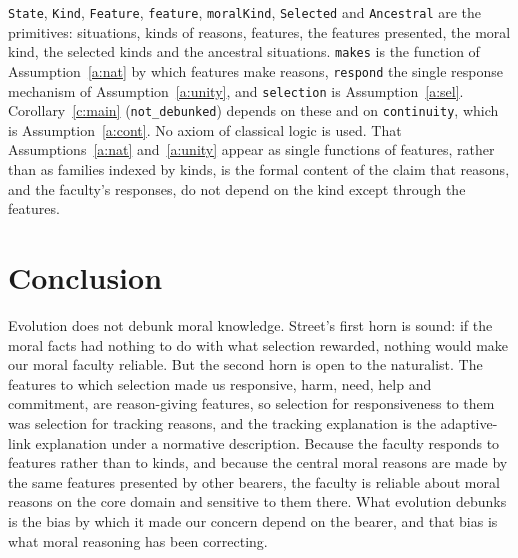 \documentclass{situationist-preprint}
\begin{document}
\texttt{State}, \texttt{Kind}, \texttt{Feature}, \texttt{feature}, \texttt{moralKind}, \texttt{Selected} and \texttt{Ancestral} are the primitives: situations, kinds of reasons, features, the features presented, the moral kind, the selected kinds and the ancestral situations. \texttt{makes} is the function of Assumption~\ref{a:nat} by which features make reasons, \texttt{respond} the single response mechanism of Assumption~\ref{a:unity}, and \texttt{selection} is Assumption~\ref{a:sel}. Corollary~\ref{c:main} (\texttt{not\_debunked}) depends on these and on \texttt{continuity}, which is Assumption~\ref{a:cont}. No axiom of classical logic is used. That Assumptions~\ref{a:nat} and~\ref{a:unity} appear as single functions of features, rather than as families indexed by kinds, is the formal content of the claim that reasons, and the faculty's responses, do not depend on the kind except through the features.

\section{Conclusion}

Evolution does not debunk moral knowledge. Street's first horn is sound: if the moral facts had nothing to do with what selection rewarded, nothing would make our moral faculty reliable. But the second horn is open to the naturalist. The features to which selection made us responsive, harm, need, help and commitment, are reason-giving features, so selection for responsiveness to them was selection for tracking reasons, and the tracking explanation is the adaptive-link explanation under a normative description. Because the faculty responds to features rather than to kinds, and because the central moral reasons are made by the same features presented by other bearers, the faculty is reliable about moral reasons on the core domain and sensitive to them there. What evolution debunks is the bias by which it made our concern depend on the bearer, and that bias is what moral reasoning has been correcting.
\end{document}
